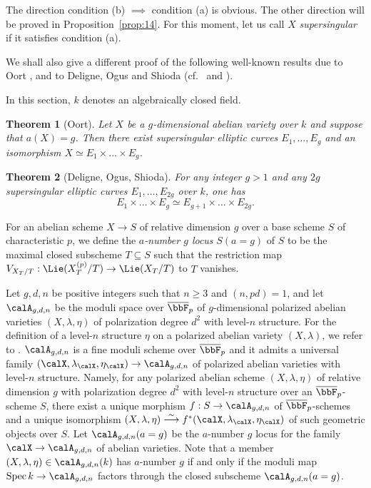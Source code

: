 \documentclass[]{amsart}
\theoremstyle{plain}
\newtheorem{thm}{Theorem}
\theoremstyle{definition}
\theoremstyle{remark}
\def\Spec{{\rm Spec}\,}
\def\Fpbar{\overline{\bbF}_p}
\newcommand{\<}{\langle}   %
\renewcommand{\>}{\rangle} %
\newcommand{\isoto}{\stackrel{\sim}{\longrightarrow}}
\newcommand{\ac}{algebraically closed }
\begin{document}
The direction condition (b) $\implies$ 
condition (a) is obvious. The other direction will be proved in Proposition~\ref{prop:14}.
For this moment, let us call $X$ \emph{supersingular} if it satisfies condition (a).

We shall also give a different proof of the following well-known results due to Oort \cite[Theorem 2]{oort:product}, and to Deligne, Ogus and Shioda (cf.~{\cite[Theorem 6.2]{ogus:ss}} and {\cite[Theorem 3.5]{shioda}}). 

In this section, $k$ denotes an \ac field.
\begin{thm}[Oort]
  \label{thm:oort}
  Let $X$ be a $g$-dimensional abelian variety over $k$ 
  and suppose that $a(X)=g$. Then there exist supersingular
  elliptic
  curves $E_1,\dots, E_g$ and an isomorphism $X\simeq E_1\times
  \dots \times E_g$.  
\end{thm}


\begin{thm}[Deligne, Ogus, Shioda] \label{thm:DOS}
  For any integer $g>1$ and  any $2g$ 
  supersingular elliptic
  curves $E_1,\dots, E_{2g}$ over $k$, one has
  \begin{equation}
    \label{eq:4}
    E_1\times \dots \times E_g\simeq E_{g+1}\times \dots \times E_{2g}.
  \end{equation}
\end{thm}
For an abelian scheme $X\to S$ of relative dimension $g$ over a base scheme $S$ of characteristic $p$, we define the \emph{$a$-number $g$ locus} $S(a=g)$ of $S$ to be the maximal closed subscheme $T\subseteq S$ such that the restriction map $V_{X_T/T}: \Lie(X^{(p)}_T/T) \to \Lie(X_T/T)$ to $T$ vanishes. 

Let $g,d,n$ be positive integers such that $n\ge 3$ and $(n,pd)=1$, and let $\calA_{g,d,n}$ be the moduli space over $\Fpbar$ of $g$-dimensional polarized abelian varieties $(X,\lambda,\eta)$ of polarization degree $d^2$ with level-$n$ structure.   For the definition of a level-$n$ structure $\eta$ on a polarized abelian variety $(X,\lambda)$, we refer to \cite[Section 2.1, p.~453]{yu:ss_siegel}. $\calA_{g,d,n}$ is a fine moduli scheme over $\Fpbar$ and it admits a universal family $(\calX,\lambda_\calX, \eta_\calX) \to \calA_{g,d,n}$ of polarized abelian varieties with level-$n$ structure. Namely, for any polarized abelian scheme $(X,\lambda,\eta)$ of relative dimension $g$ with polarization degree $d^2$ with level-$n$ structure over an $\Fpbar$-scheme $S$, there exist a unique morphism $f:S\to \calA_{g,d,n}$ of $\Fpbar$-schemes and a unique isomorphism $(X,\lambda,\eta)\isoto f^*(\calX,\lambda_\calX, \eta_\calX)$ of such geometric objects over $S$.   
Let $\calA_{g,d,n}(a=g)$ be the $a$-number $g$ locus for the family $\calX\to \calA_{g,d,n}$ of abelian varieties.
Note that a member $(X,\lambda,\eta)\in \calA_{g,d,n}(k)$ has $a$-number $g$ if and only if the moduli map $\Spec k \to \calA_{g,d,n}$ factors through the closed subscheme $\calA_{g,d,n}(a=g)$.
\end{document}
